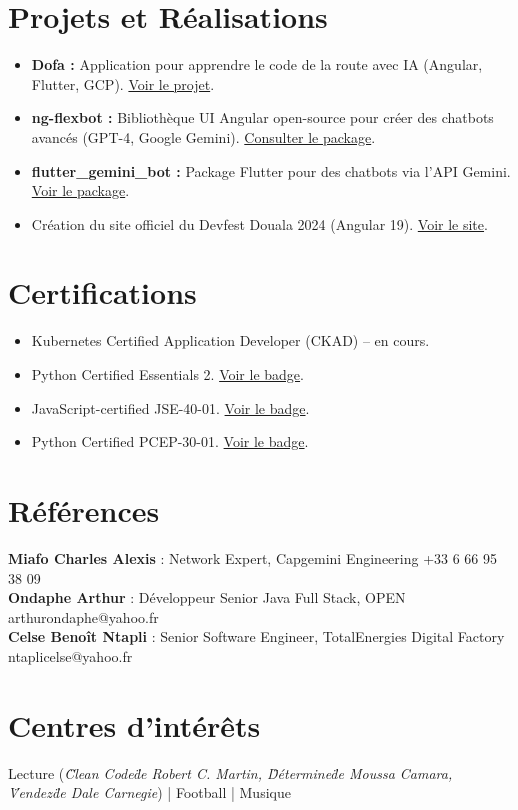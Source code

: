 \documentclass[a4paper,10pt]{article}
\begin{document}
\section*{Projets et Réalisations}
\begin{itemize}[leftmargin=0.3cm]
    \item \textbf{Dofa :} Application pour apprendre le code de la route avec IA (Angular, Flutter, GCP). \href{https://dofa.devpea.com/}{Voir le projet}.
    \item \textbf{ng-flexbot :} Bibliothèque UI Angular open-source pour créer des chatbots avancés (GPT-4, Google Gemini). \href{https://www.npmjs.com/package/ng-flexbot}{Consulter le package}.
    \item \textbf{flutter\_gemini\_bot :} Package Flutter pour des chatbots via l'API Gemini. \href{https://pub.dev/packages/flutter_gemini_bot}{Voir le package}.
    \item Création du site officiel du Devfest Douala 2024 (Angular 19). \href{https://devfest.gdgdouala.com/}{Voir le site}.
\end{itemize}

\section*{Certifications}
\begin{itemize}[leftmargin=0.3cm]
    \item Kubernetes Certified Application Developer (CKAD) -- en cours.
    \item Python Certified Essentials 2. \href{https://www.credly.com/badges/16ae371c-f3e5-4a38-bf96-cee2ed9ce583}{Voir le badge}.
    \item JavaScript-certified JSE-40-01. \href{https://www.credly.com/badges/d4c2fabd-8fc8-4d1f-b710-051516e16e62}{Voir le badge}.
    \item Python Certified PCEP-30-01. \href{https://www.credly.com/badges/ada91607-e333-4ba5-baf0-88da4af7eafb}{Voir le badge}.
\end{itemize}

\section*{Références}
\textbf{Miafo Charles Alexis} : Network Expert, Capgemini Engineering \hfill +33 6 66 95 38 09\\
\textbf{Ondaphe Arthur} : Développeur Senior Java Full Stack, OPEN \hfill arthurondaphe@yahoo.fr\\
\textbf{Celse Benoît Ntapli} : Senior Software Engineer, TotalEnergies Digital Factory \hfill ntaplicelse@yahoo.fr

\section*{Centres d'intérêts}
Lecture (\textit{\"Clean Code\" de Robert C. Martin, \"Détermine\" de Moussa Camara, \"Vendez\" de Dale Carnegie}) | Football | Musique
\end{document}
